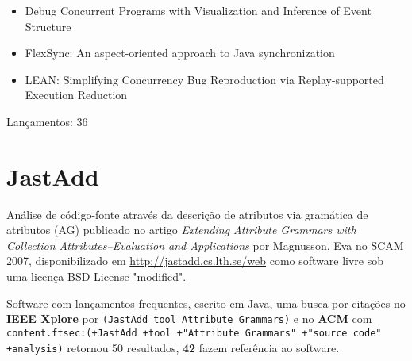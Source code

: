 \begin{itemize}
\item Debug Concurrent Programs with Visualization and Inference of Event Structure
\item FlexSync: An aspect-oriented approach to Java synchronization
\item LEAN: Simplifying Concurrency Bug Reproduction via Replay-supported Execution Reduction
\end{itemize}

Lançamentos: 36

\section{JastAdd}

Análise de código-fonte através da descrição de atributos via gramática de atributos (AG)
publicado no artigo {\it Extending Attribute Grammars with Collection Attributes--Evaluation and Applications}
por Magnusson, Eva
no SCAM 2007,
disponibilizado em \url{http://jastadd.cs.lth.se/web}
como software livre
sob uma licença BSD License "modified".

Software com lançamentos frequentes,
escrito em Java,
uma busca por citações no {\bf IEEE Xplore} por
\texttt{(JastAdd tool Attribute Grammars)}
e no {\bf ACM} com
\texttt{content.ftsec:(+JastAdd +tool +"Attribute Grammars" +"source code" +analysis)}
retornou
50 resultados,
{\bf 42} fazem referência ao software.

